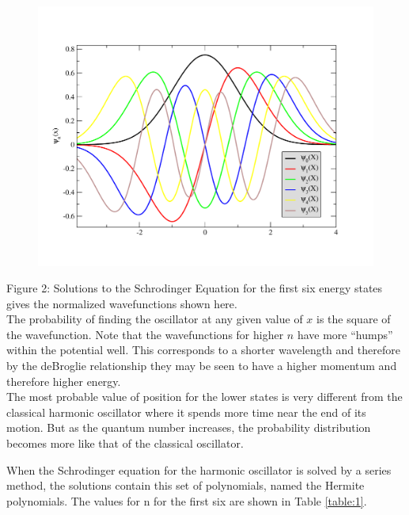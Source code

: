 \documentclass{article}
\begin{document}
\begin{figure}[h]
\begin{center}
\includegraphics[scale=0.4, angle=-90]{./hermite}
\end{center}
\label{fig:2}
\end{figure}

\noindent
Figure 2: Solutions to the Schrodinger Equation for the first six energy states gives the normalized wavefunctions
shown here.\\

\noindent
The probability of finding the oscillator at any given value of $x$ is the square of the wavefunction. Note that
the wavefunctions for higher $n$ have more “humps” within the potential well. This corresponds to a shorter
wavelength and therefore by the deBroglie relationship they may be seen to have a higher momentum and
therefore higher energy.\\

\noindent
The most probable value of position for the lower states is very different from the classical harmonic oscillator
where it spends more time near the end of its motion. But as the quantum number increases, the probability
distribution becomes more like that of the classical oscillator.\pagebreak

\noindent
When the Schrodinger equation for the harmonic oscillator is solved by a series method, the solutions contain
this set of polynomials, named the Hermite polynomials. The values for n for the first six are shown in Table \ref{table:1}.\\
\end{document}
